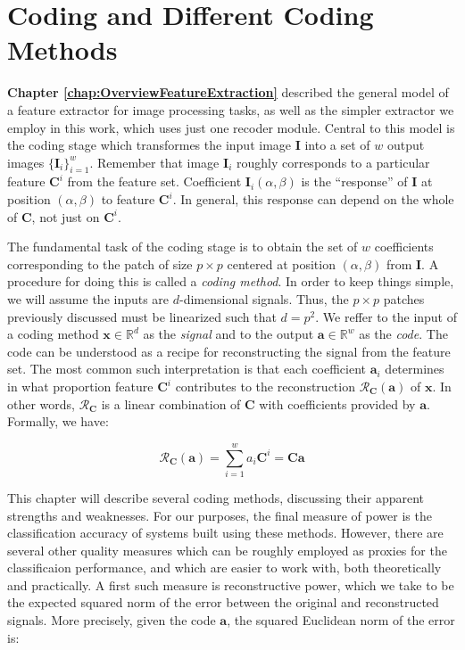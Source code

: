 \documentclass[12pt,a4paper,oneside,english]{UPBThesis}
\newcommand{\hctimes}[2]{{#1}\!\times\!{#2}}
\newcommand{\hcsignalspace}{\mathbb{R}^d}
\newcommand{\hcweightspace}{\mathbb{R}^w}
\begin{document}
\clearpage
\newpage
\thispagestyle{empty}
\mbox{}

\chapter{Coding and Different Coding Methods}
\label{chap:CodingAndCodingMethods}

\textbf{Chapter \ref{chap:OverviewFeatureExtraction}} described the general model of a feature extractor for image processing tasks, as well as the simpler extractor we employ in this work, which uses just one recoder module. Central to this model is the coding stage which transformes the input image $\textbf{I}$ into a set of $w$ output images $\{\textbf{I}_i\}_{i=1}^w$. Remember that image $\textbf{I}_i$ roughly corresponds to a particular feature $\textbf{C}^i$ from the feature set. Coefficient $\textbf{I}_i(\alpha,\beta)$ is the ``response'' of $\textbf{I}$ at position $(\alpha,\beta)$ to feature $\textbf{C}^i$. In general, this response can depend on the whole of $\textbf{C}$, not just on $\textbf{C}^i$.

The fundamental task of the coding stage is to obtain the set of $w$ coefficients corresponding to the patch of size $\hctimes{p}{p}$ centered at position $(\alpha,\beta)$ from $\textbf{I}$. A procedure for doing this is called a \emph{coding method}. In order to keep things simple, we will assume the inputs are $d$-dimensional signals. Thus, the $\hctimes{p}{p}$ patches previously discussed must be linearized such that $d = p^2$. We reffer to the input of a coding method $\textbf{x} \in \hcsignalspace$ as the \emph{signal} and to the output $\textbf{a} \in \hcweightspace$ as the \emph{code}. The code can be understood as a recipe for reconstructing the signal from the feature set. The most common such interpretation is that each coefficient $\textbf{a}_i$ determines in what proportion feature $\textbf{C}^i$ contributes to the reconstruction $\mathcal{R}_\textbf{C}(\textbf{a})$ of $\textbf{x}$. In other words, $\mathcal{R}_\textbf{C}$ is a linear combination of $\textbf{C}$ with coefficients provided by $\textbf{a}$. Formally, we have:

\begin{equation*}
\mathcal{R}_\textbf{C}(\textbf{a}) = \sum_{i=1}^{w}{a_i \textbf{C}^i} = \textbf{C}\textbf{a}
\end{equation*}

This chapter will describe several coding methods, discussing their apparent strengths and weaknesses. For our purposes, the final measure of power is the classification accuracy of systems built using these methods. However, there are several other quality measures which can be roughly employed as proxies for the classificaion performance, and which are easier to work with, both theoretically and practically. A first such measure is reconstructive power, which we take to be the expected squared norm of the error between the original and reconstructed signals. More precisely, given the code $\textbf{a}$, the squared Euclidean norm of the error is:
\end{document}

